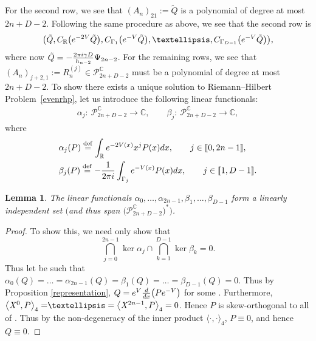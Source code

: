 \documentclass[11pt]{article}
\numberwithin{equation}{section}
\numberwithin{equation}{section}
\newtheorem{Lemma}[Theorem]{Lemma}
\begin{document}
For the second row, we see that $(A_{n})_{21} := \tilde{Q}$ is a polynomial of degree at most $2n+D-2$. Following the same procedure as above, we see that the second row is
\begin{equation*}
\big( \tilde{Q} , C_{\mathbb{R}}\big({\rm e}^{-2V} \tilde{Q}\big) , C_{\Gamma_1}\big({\rm e}^{-V} \tilde{Q}\big) , \dots , C_{\Gamma_{D-1}}\big({\rm e}^{-V} \tilde{Q}\big)
\big),
\end{equation*}
where now $\tilde{Q} = - \frac{2\pi {\rm i} \gamma D}{h_{n-2}} \Psi_{2n-2}$. For the remaining rows, we see that $(A_n)_{j+2,1} := R^{(j)}_n \in \mathscr{P}^{\mathbb{C}}_{2n+D-2}$ must be a polynomial of degree at most $2n+D-2$. To show there exists a unique solution to Riemann--Hilbert Problem~\ref{evenrhp}, let us introduce the following linear functionals:
\begin{align*}
\alpha_j \colon\ \mathscr{P}^{\mathbb{C}}_{2n+D-2} \longrightarrow \mathbb{C},\qquad
\beta_j \colon\ \mathscr{P}^{\mathbb{C}}_{2n+D-2} \longrightarrow \mathbb{C},
\end{align*}
where
\begin{align}
&\alpha_j(P) \overset{\mathrm{def}}{=} \int_\mathbb{R} {\rm e}^{-2V(x)} x^j P(x) {\rm d}x,\qquad j \in [\![ 0, 2n-1 ]\!],\label{alpha} \\
&\beta_j(P) \overset{\mathrm{def}}{=} -\frac{1}{2\pi {\rm i}} \int_{\Gamma_j} {\rm e}^{-V(x)} P(x) {\rm d}x,\qquad j \in [\![ 1, D-1]\!]. \label{beta}
\end{align}
\begin{Lemma}\label{linindep}The linear functionals $\alpha_0, \dots, \alpha_{2n-1}, \beta_1, \dots, \beta_{D-1}$ form a linearly independent set $\big($and thus span $\big(\mathscr{P}_{2n+D-2}^{\mathbb{C}}\big)^\ast\big)$.
\end{Lemma}

\begin{proof}
To show this, we need only show that
\begin{equation*}
\bigcap_{j=0}^{2n-1} \ker \alpha_j \cap \bigcap_{k=1}^{D-1} \ker \beta_k = 0.
\end{equation*}
Thus let  be such that $\alpha_0(Q) = \dots = \alpha_{2n-1}(Q)= \beta_1(Q) = \dots = \beta_{D-1}(Q)=0$. Thus by Proposition \ref{representation}, $Q = {\rm e}^V \frac{\rm d}{{\rm d}x}\big( P {\rm e}^{-V}\big)$ for some . Furthermore, $\smash{\big\langle \mathit{X}^0, P \big\rangle_4 =} \dots = \big\langle \mathit{X}^{2n-1}, P \big\rangle_4 = 0$. Hence $P$ is skew-orthogonal to all of . Thus by the non-degeneracy of the inner product $\langle \cdot,\cdot \rangle_4$, $P \equiv 0$, and hence $Q \equiv 0$.
\end{proof}
\end{document}
